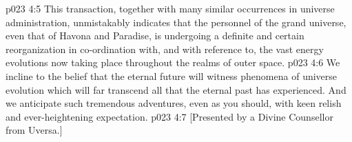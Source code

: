 \vs p023 4:5 \pc This transaction, together with many similar occurrences in universe administration, unmistakably indicates that the personnel of the grand universe, even that of Havona and Paradise, is undergoing a definite and certain reorganization in co\hyp{}ordination with, and with reference to, the vast energy evolutions now taking place throughout the realms of outer space.
\vs p023 4:6 We incline to the belief that the eternal future will witness phenomena of universe evolution which will far transcend all that the eternal past has experienced. And we anticipate such tremendous adventures, even as you should, with keen relish and ever\hyp{}heightening expectation.
\vsetoff
\vs p023 4:7 [Presented by a Divine Counsellor from Uversa.]
\quizlink
